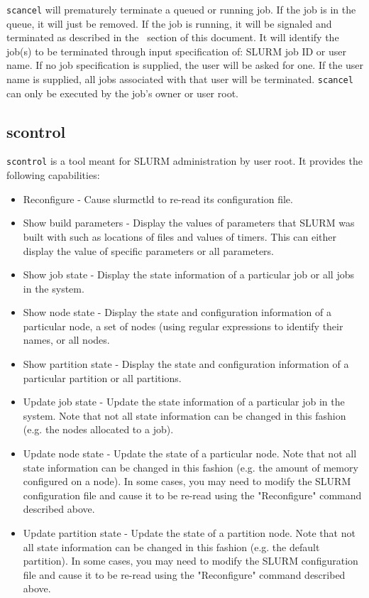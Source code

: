 {\tt scancel} will prematurely terminate a queued or running job.
If the job is in the queue, it will just be removed.  If the job is
running, it will be signaled and terminated as described in the \slurmd\
section of this document.  It will identify the job(s) to be terminated
through input specification of: SLURM job ID or user name.  If no job
specification is supplied, the user will be asked for one.  If the user
name is supplied, all jobs associated with that user will be terminated.
{\tt scancel} can only be executed by the job's owner or user root.

\subsection{scontrol}

{\tt scontrol} is a tool meant for SLURM administration by user root. 
It provides the following capabilities:
\begin{itemize}
\item Reconfigure - Cause slurmctld to re-read its configuration file.
\item Show build parameters - Display the values of parameters that SLURM 
was built with such as locations of files and values of timers. This can 
either display the value of specific parameters or all parameters.
\item Show job state - Display the state information of a particular job 
or all jobs in the system.
\item Show node state - Display the state and configuration information 
of a particular node, a set of nodes (using regular expressions to 
identify their names, or all nodes.
\item Show partition state - Display the state and configuration information 
of a particular partition or all partitions.
\item Update job state - Update the state information of a particular job 
in the system. Note that not all state information can be changed in this 
fashion (e.g. the nodes allocated to a job).
\item Update node state - Update the state of a particular node. Note that 
not all state information can be changed in this fashion (e.g. the amount 
of memory configured on a node). In some cases, you may need to modify 
the SLURM configuration file and cause it to be re-read using the "Reconfigure" 
command described above.
\item Update partition state - Update the state of a partition node. Note that 
not all state information can be changed in this fashion (e.g. the default 
partition). In some cases, you may need to modify the SLURM configuration 
file and cause it to be re-read using the "Reconfigure" command described above.
\end{itemize}

